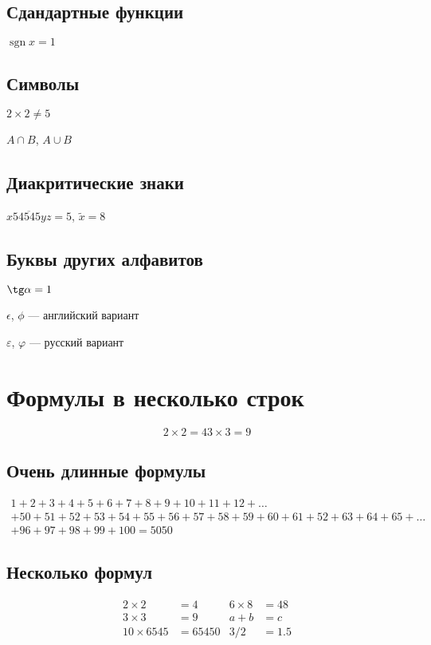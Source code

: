 \documentclass[a4paper,12pt]{article} %
\DeclareMathOperator{\sgn}{\mathop{sgn}}
\begin{document}
\subsection{Сдандартные функции}

$\sgn x = 1$


\subsection{Символы}

$2\times2\ne5$

$A\cap B$, $A\cup B$

\subsection{Диакритические знаки}

$\overline{x54545yz}=5$, $\tilde x=8$

\subsection{Буквы других алфавитов}

$\tg\alpha=1$

$\epsilon$, $\phi$ --- английский вариант

$\varepsilon$, $\varphi$ --- русский вариант


\section{Формулы в несколько строк}

$$
2\times 2 =4 
3\times 3 =9
$$

\subsection{Очень длинные формулы}

\begin{multline}
	1+2+3+4+5+6+7+8+9+10+11+12+\dots\\
	+50+51+52+53+54+55+56+57+58+59+60+61+52+63+64+65+\dots\\
	+96+97+98+99+100=5050	\tag{S} \label{eq:sum}
\end{multline}

\subsection{Несколько формул}

\begin{align*}
	2\times 2 &= 4 & 6\times8 &=48\\ 
	3\times 3 &= 9 & a+b &=c\\
	10\times 6545 &=65450 & 3/2 &=1.5
\end{align*}
\end{document}
